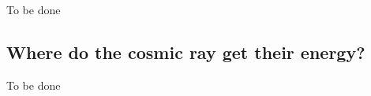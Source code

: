 {\color{red}To be done}

\subsection{Where do the cosmic ray get their energy?}

{\color{red}To be done}








